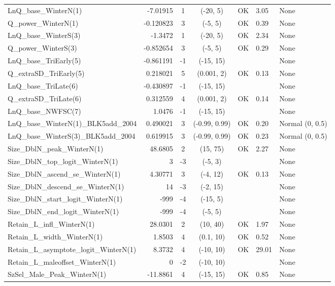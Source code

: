 \documentclass[12pt,]{article}
\begin{document}
\begin{landscape}
\begin{longtable}{lrcccll}
  LnQ\_base\_WinterN(1) & -7.01915 & 1 & (-20, 5) & OK & 3.05 & None \\ 
  Q\_power\_WinterN(1) & -0.120823 & 3 & (-5, 5) & OK & 0.39 & None \\ 
  LnQ\_base\_WinterS(3) & -1.3472 & 1 & (-20, 5) & OK & 2.34 & None \\ 
  Q\_power\_WinterS(3) & -0.852654 & 3 & (-5, 5) & OK & 0.29 & None \\ 
  LnQ\_base\_TriEarly(5) & -0.861191 & -1 & (-15, 15) &  &  & None \\ 
  Q\_extraSD\_TriEarly(5) & 0.218021 & 5 & (0.001, 2) & OK & 0.13 & None \\ 
  LnQ\_base\_TriLate(6) & -0.430897 & -1 & (-15, 15) &  &  & None \\ 
  Q\_extraSD\_TriLate(6) & 0.312559 & 4 & (0.001, 2) & OK & 0.14 & None \\ 
  LnQ\_base\_NWFSC(7) & 1.0476 & -1 & (-15, 15) &  &  & None \\ 
  LnQ\_base\_WinterN(1)\_BLK5add\_2004 & 0.490021 & 3 & (-0.99, 0.99) & OK & 0.20 & Normal (0, 0.5) \\ 
  LnQ\_base\_WinterS(3)\_BLK5add\_2004 & 0.619915 & 3 & (-0.99, 0.99) & OK & 0.23 & Normal (0, 0.5) \\ 
  Size\_DblN\_peak\_WinterN(1) & 48.6805 & 2 & (15, 75) & OK & 2.27 & None \\ 
  Size\_DblN\_top\_logit\_WinterN(1) & 3 & -3 & (-5, 3) &  &  & None \\ 
  Size\_DblN\_ascend\_se\_WinterN(1) & 4.30771 & 3 & (-4, 12) & OK & 0.13 & None \\ 
  Size\_DblN\_descend\_se\_WinterN(1) & 14 & -3 & (-2, 15) &  &  & None \\ 
  Size\_DblN\_start\_logit\_WinterN(1) & -999 & -4 & (-15, 5) &  &  & None \\ 
  Size\_DblN\_end\_logit\_WinterN(1) & -999 & -4 & (-5, 5) &  &  & None \\ 
  Retain\_L\_infl\_WinterN(1) & 28.0301 & 2 & (10, 40) & OK & 1.97 & None \\ 
  Retain\_L\_width\_WinterN(1) & 1.8503 & 4 & (0.1, 10) & OK & 0.52 & None \\ 
  Retain\_L\_asymptote\_logit\_WinterN(1) & 8.3732 & 4 & (-10, 10) & OK & 29.01 & None \\ 
  Retain\_L\_maleoffset\_WinterN(1) & 0 & -2 & (-10, 10) &  &  & None \\ 
  SzSel\_Male\_Peak\_WinterN(1) & -11.8861 & 4 & (-15, 15) & OK & 0.85 & None \\ 

\end{longtable}
\end{landscape}
\end{document}

